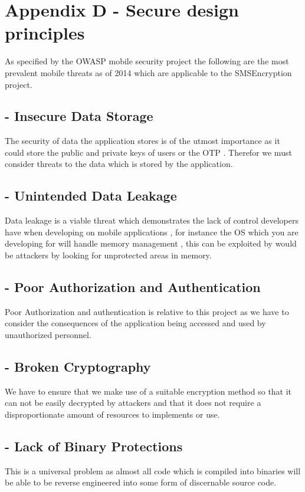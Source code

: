 \section{Appendix D - Secure design principles}

As specified by the OWASP mobile security project the following are the  most prevalent mobile threats as of 2014 which are applicable to the SMSEncryption project.

\subsection*{ - Insecure Data Storage}
The security of data the application stores is of the utmost importance as it could store the public and private keys of users or the OTP . Therefor we must consider threats to the data which is stored by the application. 
\subsection*{ - Unintended Data Leakage}
Data leakage is a viable threat which demonstrates the lack of control developers have when developing on mobile applications , for instance the OS which you are developing for will handle memory management , this can be exploited by would be attackers by looking for unprotected areas in memory.
\subsection*{ - Poor Authorization and Authentication}
Poor Authorization and authentication is relative to this project as we have to consider the consequences of the application being accessed and used by unauthorized personnel.
\subsection*{ - Broken Cryptography}
We have to ensure that we make use of a suitable encryption method so that it can not be easily decrypted by attackers and that it does  not require a disproportionate amount of resources to implements or use.
\subsection*{ - Lack of Binary Protections}
This is a universal problem as almost all code which is compiled into binaries will be able to be reverse engineered into some form of discernable source code.
